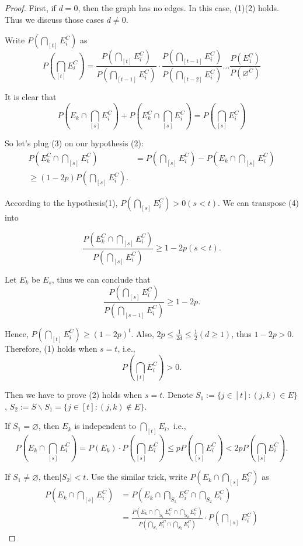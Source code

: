 \begin{proof}
   First, if $d= 0$, then the graph has no edges. In this case, (1)(2) holds. Thus we discuss those cases $d \not= 0$.
   
   
  Write $P(\bigcap_{[t]}E_i^C)$ as 
  $$P(\bigcap_{[t]}E_i^C) = \frac{P(\bigcap_{[t]} E_i^C)}{P(\bigcap_{[t-1]} E_i^C)}\cdot \frac{P(\bigcap_{[t-1]} E_i^C)}{P(\bigcap_{[t-2]}E_i^C)} \dots \frac{P(E_1^C)}{P(\varnothing^C)}$$
    
It is clear that 
   \begin{equation}
     P(E_k \cap \bigcap_{[s]}E_i^C) +  P(E_k^C \cap \bigcap_{[s]}E_i^C) = P(\bigcap_{[s]}E_i^C)
   \end{equation}
 
So let's plug (3) on our hypothesis (2):
\begin{equation}
  \begin{aligned}
   P(E_k^C \cap \bigcap_{[s]}E_i^C) &=  P(\bigcap_{[s]}E_i^C) -  P(E_k \cap \bigcap_{[s]}E_i^C)\\
     \geq (1-2p) P(\bigcap_{[s]}E_i^C).
  \end{aligned}
\end{equation}

According to the hypothesis(1), $P(\bigcap_{[s]}E_i^C) > 0(s < t)$. We can transpose (4) into

\begin{equation}
  \frac{P(E_k^C \cap \bigcap_{[s]}E_i^C)}{P(\bigcap_{[s]}E_i^C)} \geq 1-2p(s<t).
\end{equation} 
    
Let $E_k$ be $E_s$, thus we can conclude that 
$$\frac{P(\bigcap_{[s]}E_i^C)}{P(\bigcap_{[s-1]}E_i^C)} \geq 1-2p.$$

Hence, $P(\bigcap_{[t]}E_i^C) \geq (1-2p)^t.$ Also, $2p \leq \frac{1}{2d} \leq \frac{1}{2}(d \geq 1)$, thus $1-2p >0$. Therefore, (1) holds when $s=t$, i.e.,
$$P(\bigcap_{[t]}E_i^C) > 0.$$

Then we have to prove (2) holds when $s=t$. Denote 
$S_1 := \{j\in [t] : (j,k) \in E\}$, $S_2 := S\backslash S_1 = \{j\in [t] : (j,k) \notin E\}$.

If $S_1 = \varnothing$, then $E_k$ is independent to $\bigcap_{[t]}E_i,$ i.e., 
$$
P(E_k \cap \bigcap_{[s]}E_i^C) = P(E_k)\cdot P(\bigcap_{[s]}E_i^C) \leq pP(\bigcap_{[s]}E_i^C) < 2pP(\bigcap_{[s]}E_i^C).
$$

If $S_1 \not= \varnothing$, then$|S_2| < t.$ Use the similar trick, write $P(E_k \cap \bigcap_{[s]}E_i^C)$ as
\begin{equation}
  \begin{aligned}
    P(E_k \cap \bigcap_{[s]}E_i^C) & = P(E_k \cap \bigcap_{S_1}E_i^C \cap \bigcap_{S_2}E_i^C)\\
    &= \frac{P(E_k \cap \bigcap_{S_1}E_i^C \cap \bigcap_{S_2}E_i^C)}{P(\bigcap_{S_1}E_i^C \cap \bigcap_{S_2}E_i^C)}\cdot P(\bigcap_{[s]}E_i^C)
  \end{aligned}
\end{equation}


\end{proof}
